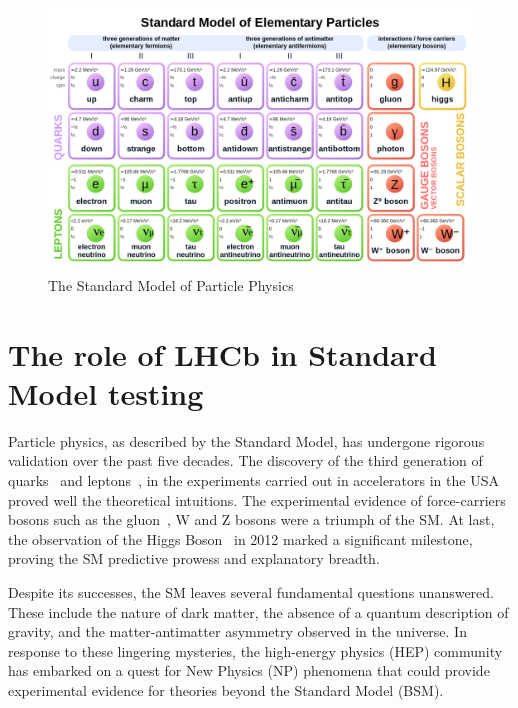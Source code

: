 \begin{figure}
    \centering
    \includegraphics[width=\textwidth]{figures/Standard_Model_of_Elementary_Particles_Anti.svg.png}
    \caption{The Standard Model of Particle Physics}
    \label{fig:SM}
\end{figure}


\section{The role of LHCb in Standard Model testing}
Particle physics, as described by the Standard Model, has undergone rigorous validation over the past five decades. The discovery of the third generation of quarks~\cite{E288:1977xhf, CDF:1995wbb} and leptons~\cite{PhysRevLett.35.1489}, in the experiments carried out in accelerators in the USA proved well the theoretical intuitions. The experimental evidence of force-carriers bosons such as the gluon~\cite{BERGER1979449}, W and Z bosons \cite{UA1:1983mne, UA2:1983mlz} were a triumph of the SM. At last, the  observation of the Higgs Boson~\cite{Aad_2012, Chatrchyan_2012} in 2012 marked a significant milestone, proving the SM predictive prowess and explanatory breadth. 

Despite its successes, the SM leaves several fundamental questions unanswered. These include the nature of dark matter, the absence of a quantum description of gravity, and the matter-antimatter asymmetry observed in the universe. In response to these lingering mysteries, the high-energy physics (HEP) community has embarked on a quest for New Physics (NP) phenomena that could provide experimental evidence for theories beyond the Standard Model (BSM). 


